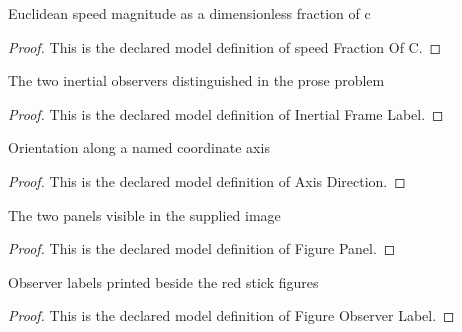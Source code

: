 \begin{definition}
  \label{def:physics:phyx-mini-0565:phyxminiproblems-problemphyxmini0565-speedfractionofc}
  Euclidean speed magnitude as a dimensionless fraction of c
\end{definition}
\begin{proof}
  This is the declared model definition of speed Fraction Of C.
\end{proof}
\begin{definition}
  \label{def:physics:phyx-mini-0565:phyxminiproblems-problemphyxmini0565-inertialframelabel}
  The two inertial observers distinguished in the prose problem
\end{definition}
\begin{proof}
  This is the declared model definition of Inertial Frame Label.
\end{proof}
\begin{definition}
  \label{def:physics:phyx-mini-0565:phyxminiproblems-problemphyxmini0565-axisdirection}
  Orientation along a named coordinate axis
\end{definition}
\begin{proof}
  This is the declared model definition of Axis Direction.
\end{proof}
\begin{definition}
  \label{def:physics:phyx-mini-0565:phyxminiproblems-problemphyxmini0565-figurepanel}
  The two panels visible in the supplied image
\end{definition}
\begin{proof}
  This is the declared model definition of Figure Panel.
\end{proof}
\begin{definition}
  \label{def:physics:phyx-mini-0565:phyxminiproblems-problemphyxmini0565-figureobserverlabel}
  Observer labels printed beside the red stick figures
\end{definition}
\begin{proof}
  This is the declared model definition of Figure Observer Label.
\end{proof}
